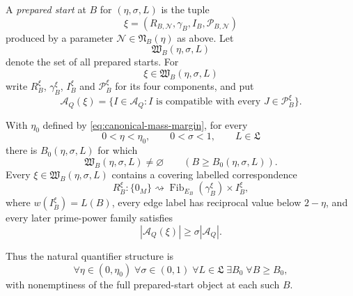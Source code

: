 A \emph{prepared start} at $B$ for $(\eta,\sigma,L)$ is the tuple
\[
\xi=(R_{B,\mathscr N},\gamma_B,I_B,\mathscr P_{B,\mathscr N})
\]
produced by a parameter $\mathscr N\in\mathfrak N_B(\eta)$ as above.  Let
\begin{equation}\label{eq:prepared-start-space}
\mathfrak W_B(\eta,\sigma,L)
\end{equation}
denote the set of all prepared starts.  For
\[
\xi\in\mathfrak W_B(\eta,\sigma,L)
\]
write $R_B^\xi$, $\gamma_B^\xi$, $I_B^\xi$ and $\mathscr P_B^\xi$ for its four components, and put
\[
\mathcal A_Q(\xi)
=
\{I\in\mathcal A_Q:I\text{ is compatible with every }J\in\mathscr P_B^\xi\}.
\]

\begin{proposition}\label{prop:wide-start}
With $\eta_0$ defined by \eqref{eq:canonical-mass-margin}, for every
\[
0<\eta<\eta_0,
\qquad
0<\sigma<1,
\qquad
L\in\mathfrak L
\]
there is $B_0(\eta,\sigma,L)$ for which
\begin{equation}\label{eq:wide-start-regular-epi}
\mathfrak W_B(\eta,\sigma,L)\ne\varnothing
\qquad(B\ge B_0(\eta,\sigma,L)).
\end{equation}
Every $\xi\in\mathfrak W_B(\eta,\sigma,L)$ contains a covering labelled correspondence
\[
R_B^\xi:\{0_M\}\rightsquigarrow
\operatorname{Fib}_{E_B}(\gamma_B^\xi)\times I_B^\xi,
\]
where $w(I_B^\xi)=L(B)$, every edge label has reciprocal value below $2-\eta$, and every later prime-power family satisfies
\[
|\mathcal A_Q(\xi)|\ge\sigma|\mathcal A_Q|.
\]
\end{proposition}

Thus the natural quantifier structure is
\begin{equation}\label{eq:wide-start-quantifiers}
\forall\eta\in(0,\eta_0)\;
\forall\sigma\in(0,1)\;
\forall L\in\mathfrak L\;
\exists B_0\;
\forall B\ge B_0,
\end{equation}
with nonemptiness of the full prepared-start object at each such $B$.
